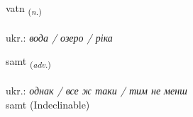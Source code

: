 \documentclass[frontgrid, backgrid]{flacards}\usepackage[]{graphicx}\usepackage[]{xcolor}
\begin{document}
\renewcommand{\flhead}{\vskip5pt \fboxsep=0pt {\small\bfseries\footnotesize Nafnorð | іменник}}
\renewcommand{\fcfoot}{\vskip5pt \fboxsep=0pt \hspace{2pt}{\small\bfseries\footnotesize 1K}}

\renewcommand{\blhead}{\vskip5pt {\small\bfseries\footnotesize Nafnorð | іменник }}
\renewcommand{\bcfoot}{\vskip5pt \hspace{2pt}{\small\bfseries\footnotesize 1K}}


{vatn \small{\textsubscript{(\textit{n.})}} \\[1ex] %
\textphonetic{[vahtn̥]} \\
ukr.: \emph{вода / озеро / ріка} \\  [2ex]
\renewcommand*{\arraystretch}{0.8}
}


\renewcommand{\flhead}{\vskip5pt \fboxsep=0pt {\small\bfseries\footnotesize Atviksorð | прислівник}}
\renewcommand{\fcfoot}{\vskip5pt \fboxsep=0pt \hspace{2pt}{\small\bfseries\footnotesize 1K}}

\renewcommand{\blhead}{\vskip5pt {\small\bfseries\footnotesize Atviksorð | прислівник }}
\renewcommand{\bcfoot}{\vskip5pt \hspace{2pt}{\small\bfseries\footnotesize 1K}}


{samt \small{\textsubscript{(\textit{adv.})}} \\[1ex]
\textphonetic{[sam̥t]} \\
ukr.: \emph{однак / все ж таки / тим не менш} \\  [2ex]
samt (Indeclinable)}

\renewcommand{\flhead}{\vskip5pt \fboxsep=0pt {\small\bfseries\footnotesize Nafnorð | іменник}}
\renewcommand{\fcfoot}{\vskip5pt \fboxsep=0pt \hspace{2pt}{\small\bfseries\footnotesize 1K}}
\end{document}
